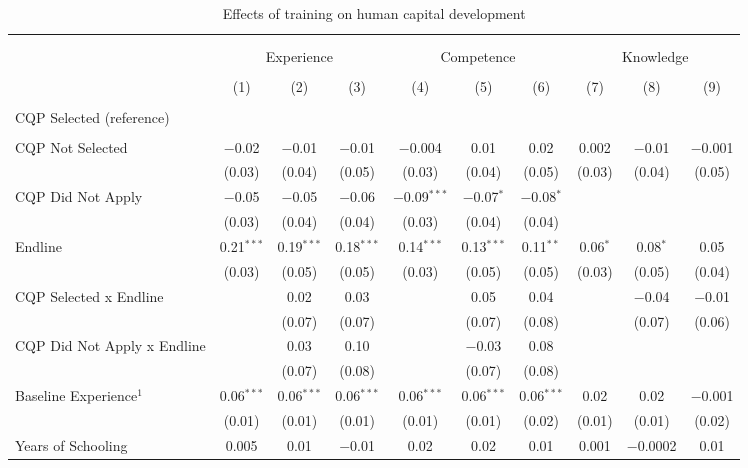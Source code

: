 \documentclass[
  11pt,
a4paper
]{article}
\begin{document}
\begin{table}[H] \centering 
  \caption{Effects of training on human capital development} 
  \label{tab:tbl-appreg} 
\scriptsize 
\begin{tabular}{@{\extracolsep{-8pt}}lccccccccc} 
\\[-1.8ex]\hline 
\hline \\[-1.8ex] 
\\[-1.8ex] & \multicolumn{3}{c}{Experience} & \multicolumn{3}{c}{Competence} & \multicolumn{3}{c}{Knowledge} \\ 
\\[-1.8ex] & (1) & (2) & (3) & (4) & (5) & (6) & (7) & (8) & (9)\\ 
\hline \\[-1.8ex] 
 CQP Selected (reference) \\ \\ CQP Not Selected & $-$0.02 & $-$0.01 & $-$0.01 & $-$0.004 & 0.01 & 0.02 & 0.002 & $-$0.01 & $-$0.001 \\ 
  & (0.03) & (0.04) & (0.05) & (0.03) & (0.04) & (0.05) & (0.03) & (0.04) & (0.05) \\ 
  CQP Did Not Apply & $-$0.05 & $-$0.05 & $-$0.06 & $-$0.09$^{***}$ & $-$0.07$^{*}$ & $-$0.08$^{*}$ &  &  &  \\ 
  & (0.03) & (0.04) & (0.04) & (0.03) & (0.04) & (0.04) &  &  &  \\ 
  Endline & 0.21$^{***}$ & 0.19$^{***}$ & 0.18$^{***}$ & 0.14$^{***}$ & 0.13$^{***}$ & 0.11$^{**}$ & 0.06$^{*}$ & 0.08$^{*}$ & 0.05 \\ 
  & (0.03) & (0.05) & (0.05) & (0.03) & (0.05) & (0.05) & (0.03) & (0.05) & (0.04) \\ 
  CQP Selected x Endline &  & 0.02 & 0.03 &  & 0.05 & 0.04 &  & $-$0.04 & $-$0.01 \\ 
  &  & (0.07) & (0.07) &  & (0.07) & (0.08) &  & (0.07) & (0.06) \\ 
  CQP Did Not Apply x Endline &  & 0.03 & 0.10 &  & $-$0.03 & 0.08 &  &  &  \\ 
  &  & (0.07) & (0.08) &  & (0.07) & (0.08) &  &  &  \\ 
  Baseline Experience$^1$ & 0.06$^{***}$ & 0.06$^{***}$ & 0.06$^{***}$ & 0.06$^{***}$ & 0.06$^{***}$ & 0.06$^{***}$ & 0.02 & 0.02 & $-$0.001 \\ 
  & (0.01) & (0.01) & (0.01) & (0.01) & (0.01) & (0.02) & (0.01) & (0.01) & (0.02) \\ 
  Years of Schooling & 0.005 & 0.01 & $-$0.01 & 0.02 & 0.02 & 0.01 & 0.001 & $-$0.0002 & 0.01 \\ 

\end{tabular}
\end{table}
\end{document}
